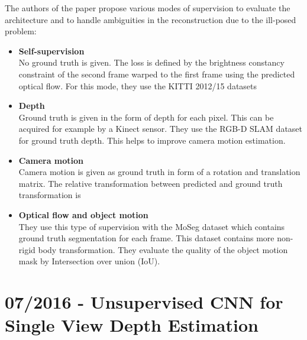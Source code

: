         The authors of the paper propose various modes of supervision to evaluate the architecture and to handle ambiguities in the reconstruction due to the ill-posed problem:
        \begin{itemize}
            \item \textbf{Self-supervision}
                \\
                No ground truth is given.
                The loss is defined by the brightness constancy constraint of the second frame warped to the first frame using the predicted optical flow.
                For this mode, they use the {KITTI} 2012/15 datasets
            \item \textbf{Depth}
                \\
                Ground truth is given in the form of depth for each pixel.
                This can be acquired for example by a Kinect sensor.
                They use the {RGB-D SLAM} dataset for ground truth depth.
                This helps to improve camera motion estimation. 
            \item \textbf{Camera motion}
                \\
                Camera motion is given as ground truth in form of a rotation and translation matrix.
                The relative transformation between predicted and ground truth transformation is 
            \item \textbf{Optical flow and object motion}
                \\
                They use this type of supervision with the MoSeg dataset which contains ground truth segmentation for each frame.
                This dataset contains more non-rigid body transformation.
                They evaluate the quality of the object motion mask by Intersection over union (IoU).
        \end{itemize}
        
    \section{07/2016 - Unsupervised CNN for Single View Depth Estimation}
    
